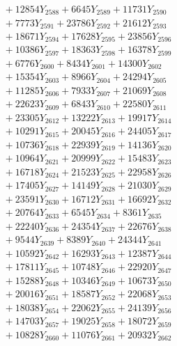 \documentclass[a4paper,10pt]{article}
\begin{document}
{\begin{align}
&\;  + 12854 Y_{2588} + 6645 Y_{2589} + 11731 Y_{2590} \\[0.3ex]
&\;  + 7773 Y_{2591} + 23786 Y_{2592} + 21612 Y_{2593} \\[0.3ex]
&\;  + 18671 Y_{2594} + 17628 Y_{2595} + 23856 Y_{2596} \\[0.3ex]
&\;  + 10386 Y_{2597} + 18363 Y_{2598} + 16378 Y_{2599} \\[0.3ex]
&\;  + 6776 Y_{2600} + 8434 Y_{2601} + 14300 Y_{2602} \\[0.3ex]
&\;  + 15354 Y_{2603} + 8966 Y_{2604} + 24294 Y_{2605} \\[0.3ex]
&\;  + 11285 Y_{2606} + 7933 Y_{2607} + 21069 Y_{2608} \\[0.5ex]\allowbreak
&\;  + 22623 Y_{2609} + 6843 Y_{2610} + 22580 Y_{2611} \\[0.3ex]
&\;  + 23305 Y_{2612} + 13222 Y_{2613} + 19917 Y_{2614} \\[0.3ex]
&\;  + 10291 Y_{2615} + 20045 Y_{2616} + 24405 Y_{2617} \\[0.3ex]
&\;  + 10736 Y_{2618} + 22939 Y_{2619} + 14136 Y_{2620} \\[0.3ex]
&\;  + 10964 Y_{2621} + 20999 Y_{2622} + 15483 Y_{2623} \\[0.3ex]
&\;  + 16718 Y_{2624} + 21523 Y_{2625} + 22958 Y_{2626} \\[0.3ex]
&\;  + 17405 Y_{2627} + 14149 Y_{2628} + 21030 Y_{2629} \\[0.3ex]
&\;  + 23591 Y_{2630} + 16712 Y_{2631} + 16692 Y_{2632} \\[0.3ex]
&\;  + 20764 Y_{2633} + 6545 Y_{2634} + 8361 Y_{2635} \\[0.3ex]
&\;  + 22240 Y_{2636} + 24354 Y_{2637} + 22676 Y_{2638} \\[0.5ex]\allowbreak
&\;  + 9544 Y_{2639} + 8389 Y_{2640} + 24344 Y_{2641} \\[0.3ex]
&\;  + 10592 Y_{2642} + 16293 Y_{2643} + 12387 Y_{2644} \\[0.3ex]
&\;  + 17811 Y_{2645} + 10748 Y_{2646} + 22920 Y_{2647} \\[0.3ex]
&\;  + 15288 Y_{2648} + 10346 Y_{2649} + 10673 Y_{2650} \\[0.3ex]
&\;  + 20016 Y_{2651} + 18587 Y_{2652} + 22068 Y_{2653} \\[0.3ex]
&\;  + 18038 Y_{2654} + 22062 Y_{2655} + 24139 Y_{2656} \\[0.3ex]
&\;  + 14703 Y_{2657} + 19025 Y_{2658} + 18072 Y_{2659} \\[0.3ex]
&\;  + 10828 Y_{2660} + 11076 Y_{2661} + 20932 Y_{2662} \\[0.3ex]

\end{align}}
\end{document}
